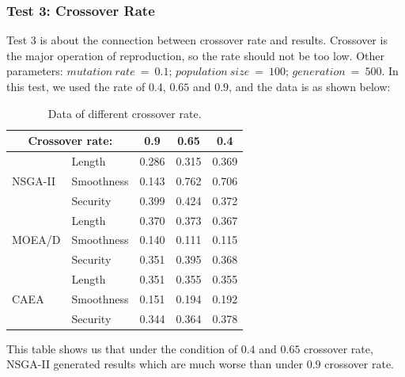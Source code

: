 \documentclass[a4paper, 11pt]{article}
\begin{document}
\subsubsection{Test 3: Crossover Rate}
Test 3 is about the connection between crossover rate and results.
Crossover is the major operation of reproduction, so the rate should not be too low.
Other parameters: $mutation\ rate\ =\ 0.1$; $population\ size\ =\ 100$; $generation\ =\ 500$.
In this test, we used the rate of $0.4$, $0.65$ and $0.9$, and the data is as shown below:
\clearpage
\begin{table}[htb]
  \centering
    \begin{tabular}{|l|l|c|c|c|}
    \hline
    \multicolumn{2}{|c|}{Crossover rate:}& 0.9 & 0.65 & 0.4\\
    \hline
    \multirow{3}{*}{NSGA-II}& Length & 0.286 & 0.315 & 0.369\\
                            & Smoothness & 0.143 & 0.762 & 0.706\\
                            & Security & 0.399 & 0.424 & 0.372\\
    \hline
    \multirow{3}{*}{MOEA/D} & Length & 0.370 & 0.373 & 0.367\\
                            & Smoothness & 0.140 & 0.111 & 0.115\\
                            & Security & 0.351 & 0.395 & 0.368\\
    \hline
    \multirow{3}{*}{CAEA}   & Length & 0.351 & 0.355 & 0.355\\
                            & Smoothness & 0.151 & 0.194 & 0.192\\
                            & Security & 0.344 & 0.364 & 0.378\\
    \hline
    \end{tabular}
  \caption{Data of different crossover rate.}
\end{table}
\begin{flushleft}
This table shows us that under the condition of $0.4$ and $0.65$ crossover rate, NSGA-II generated results which are much worse than under $0.9$ crossover rate.
\end{flushleft}
\end{document}
